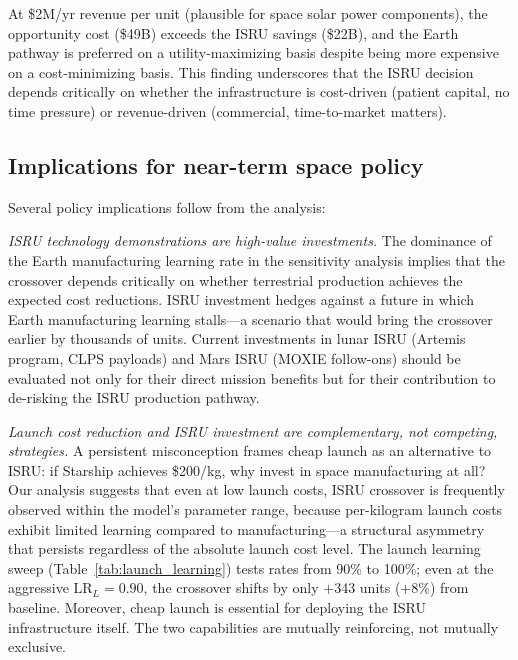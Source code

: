 \documentclass[preprint,12pt]{elsarticle}
\begin{document}
At \$2M/yr revenue per unit (plausible for space solar power components), the opportunity cost (\$49B) exceeds the ISRU savings (\$22B), and the Earth pathway is preferred on a utility-maximizing basis despite being more expensive on a cost-minimizing basis. This finding underscores that the ISRU decision depends critically on whether the infrastructure is cost-driven (patient capital, no time pressure) or revenue-driven (commercial, time-to-market matters).

\subsection{Implications for near-term space policy}

Several policy implications follow from the analysis:

\emph{ISRU technology demonstrations are high-value investments.} The dominance of the Earth manufacturing learning rate in the sensitivity analysis implies that the crossover depends critically on whether terrestrial production achieves the expected cost reductions. ISRU investment hedges against a future in which Earth manufacturing learning stalls---a scenario that would bring the crossover earlier by thousands of units. Current investments in lunar ISRU (Artemis program, CLPS payloads) and Mars ISRU (MOXIE follow-ons) should be evaluated not only for their direct mission benefits but for their contribution to de-risking the ISRU production pathway.

\emph{Launch cost reduction and ISRU investment are complementary, not competing, strategies.} A persistent misconception frames cheap launch as an alternative to ISRU: if Starship achieves \$200/kg, why invest in space manufacturing at all? Our analysis suggests that even at low launch costs, ISRU crossover is frequently observed within the model's parameter range, because per-kilogram launch costs exhibit limited learning compared to manufacturing---a structural asymmetry that persists regardless of the absolute launch cost level. The launch learning sweep (Table~\ref{tab:launch_learning}) tests rates from 90\% to 100\%; even at the aggressive $\mathrm{LR}_L = 0.90$, the crossover shifts by only $+$343 units ($+$8\%) from baseline. Moreover, cheap launch is essential for deploying the ISRU infrastructure itself. The two capabilities are mutually reinforcing, not mutually exclusive.
\end{document}
